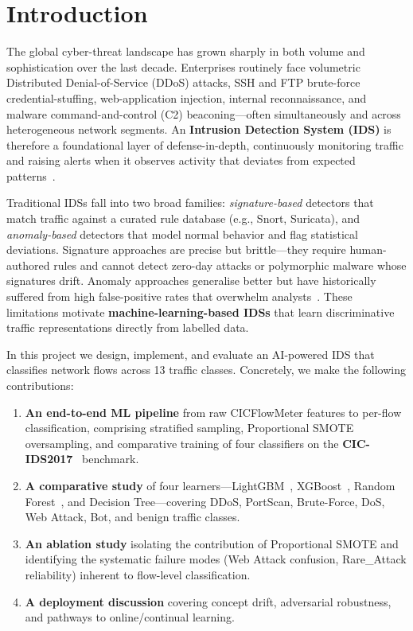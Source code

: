\section{Introduction}
\label{sec:intro}

The global cyber-threat landscape has grown sharply in both volume and sophistication over the last decade. Enterprises routinely face volumetric Distributed Denial-of-Service (DDoS) attacks, SSH and FTP brute-force credential-stuffing, web-application injection, internal reconnaissance, and malware command-and-control (C2) beaconing---often simultaneously and across heterogeneous network segments. An \textbf{Intrusion Detection System (IDS)} is therefore a foundational layer of defense-in-depth, continuously monitoring traffic and raising alerts when it observes activity that deviates from expected patterns~\cite{ref_anomaly_survey}.

Traditional IDSs fall into two broad families: \emph{signature-based} detectors that match traffic against a curated rule database (e.g., Snort, Suricata), and \emph{anomaly-based} detectors that model normal behavior and flag statistical deviations. Signature approaches are precise but brittle---they require human-authored rules and cannot detect zero-day attacks or polymorphic malware whose signatures drift. Anomaly approaches generalise better but have historically suffered from high false-positive rates that overwhelm analysts~\cite{ref_dl_ids}. These limitations motivate \textbf{machine-learning-based IDSs} that learn discriminative traffic representations directly from labelled data.

In this project we design, implement, and evaluate an AI-powered IDS that classifies network flows across 13 traffic classes. Concretely, we make the following contributions:
\begin{enumerate}
    \item \textbf{An end-to-end ML pipeline} from raw CICFlowMeter features to per-flow classification, comprising stratified sampling, Proportional SMOTE oversampling, and comparative training of four classifiers on the \textbf{CIC-IDS2017}~\cite{ref_cicids2017} benchmark.
    \item \textbf{A comparative study} of four learners---LightGBM~\cite{ref_lightgbm}, XGBoost~\cite{ref_xgboost}, Random Forest~\cite{ref_rf}, and Decision Tree---covering DDoS, PortScan, Brute-Force, DoS, Web Attack, Bot, and benign traffic classes.
    \item \textbf{An ablation study} isolating the contribution of Proportional SMOTE and identifying the systematic failure modes (Web Attack confusion, Rare\_Attack reliability) inherent to flow-level classification.
    \item \textbf{A deployment discussion} covering concept drift, adversarial robustness, and pathways to online/continual learning.
\end{enumerate}

